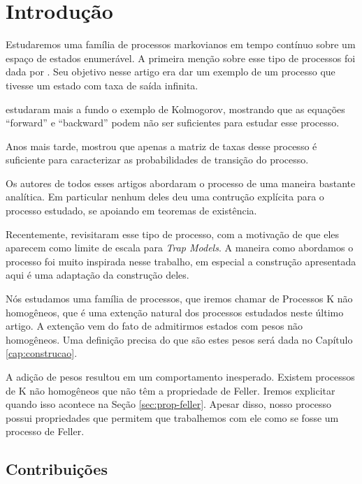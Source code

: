 \chapter{Introdução}
\label{cap:introducao}

Estudaremos uma família de processos markovianos em tempo contínuo sobre
um espaço de estados enumerável. A primeira menção sobre esse tipo de
processos foi dada por \cite{kolmogorov:54}. Seu objetivo nesse artigo
era dar um exemplo de um processo que tivesse um estado com taxa de
saída infinita.

\cite{kendall:56} estudaram mais a fundo o exemplo de Kolmogorov,
mostrando que as equações ``forward'' e ``backward'' podem não ser
suficientes para estudar esse processo.

Anos mais tarde, \cite{reuter:69} mostrou que apenas a matriz de taxas
desse processo é suficiente para caracterizar as probabilidades de
transição do processo.

Os autores de todos esses artigos abordaram o processo de uma maneira
bastante analítica. Em particular nenhum deles deu uma contrução
explícita para o processo estudado, se apoiando em teoremas de
existência.

Recentemente, \cite{fontes:08} revisitaram esse tipo de processo,
com a motivação de que eles aparecem como limite de escala para
\emph{Trap Models}. A maneira como abordamos o processo foi muito
inspirada nesse trabalho, em especial a construção apresentada aqui é
uma adaptação da construção deles.

Nós estudamos uma família de processos, que iremos chamar de Processos
K não homogêneos, que é uma extenção natural dos processos estudados
neste último artigo. A extenção vem do fato de admitirmos estados com
pesos não homogêneos. Uma definição precisa do que são estes pesos
será dada no Capítulo \ref{cap:construcao}.

A adição de pesos resultou em um comportamento inesperado. Existem
processos de K não homogêneos que não têm a propriedade de Feller.
Iremos explicitar quando isso acontece na Seção \ref{sec:prop-feller}.
Apesar disso, nosso processo possui propriedades que permitem que
trabalhemos com ele como se fosse um processo de Feller.

\section{Contribuições}
\label{sec:contribucoes}

